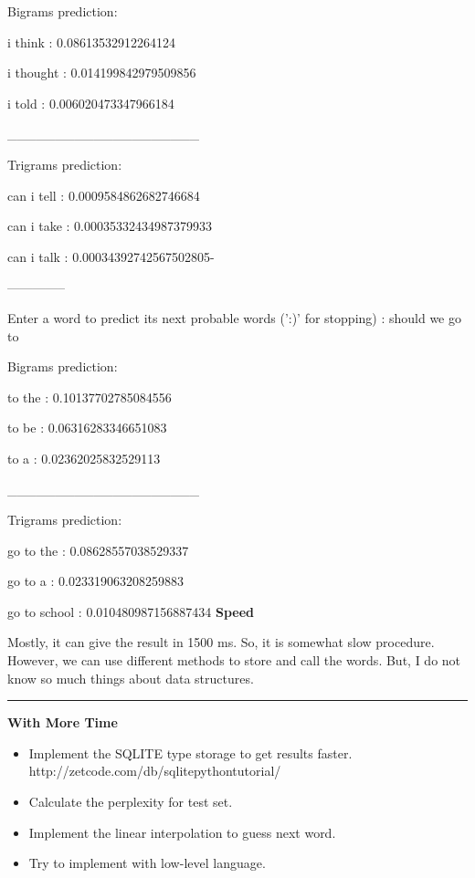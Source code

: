 \documentclass[11pt]{article}
\begin{document}
Bigrams prediction:

i think : 0.08613532912264124

i thought : 0.014199842979509856

i told : 0.006020473347966184

____________________

Trigrams prediction:

can i tell : 0.0009584862682746684

can i take : 0.00035332434987379933

can i talk : 0.00034392742567502805-

--------------

Enter a word to predict its next probable words (':)' for stopping) : should we go to

Bigrams prediction:

to the : 0.10137702785084556

to be : 0.06316283346651083

to a : 0.02362025832529113

____________________

Trigrams prediction:

go to the : 0.08628557038529337

go to a : 0.023319063208259883

go to school : 0.010480987156887434
    \textbf{Speed}

Mostly, it can give the result in 1500 ms. So, it is somewhat slow
procedure. However, we can use different methods to store and call the
words. But, I do not know so much things about data structures.

    \begin{center}\rule{0.5\linewidth}{\linethickness}\end{center}

\textbf{With More Time}

\begin{itemize}
\item
  Implement the SQLITE type storage to get results faster.
  http://zetcode.com/db/sqlitepythontutorial/
\item
  Calculate the perplexity for test set.
\item
  Implement the linear interpolation to guess next word.
\item
  Try to implement with low-level language.
\end{itemize}


    
    
    
    
\end{document}

